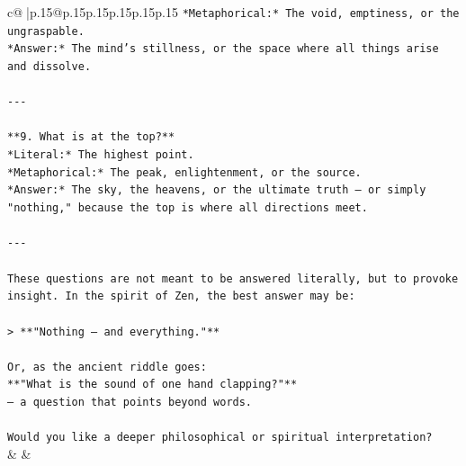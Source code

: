 \documentclass{article}
\begin{document}
{\begin{supertabular}{c@{$\;$}|p{.15\linewidth}@{}p{.15\linewidth}p{.15\linewidth}p{.15\linewidth}p{.15\linewidth}p{.15\linewidth}}
{{{\texttt{*Metaphorical:* The void, emptiness, or the ungraspable.  } \\
\texttt{*Answer:* The mind’s stillness, or the space where all things arise and dissolve.} \\
\\ 
\texttt{{-}{-}{-}} \\
\\ 
\texttt{**9. What is at the top?**  } \\
\texttt{*Literal:* The highest point.  } \\
\texttt{*Metaphorical:* The peak, enlightenment, or the source.  } \\
\texttt{*Answer:* The sky, the heavens, or the ultimate truth — or simply "nothing," because the top is where all directions meet.} \\
\\ 
\texttt{{-}{-}{-}} \\
\\ 
\texttt{These questions are not meant to be answered literally, but to provoke insight. In the spirit of Zen, the best answer may be:} \\
\\ 
\texttt{> **"Nothing — and everything."**} \\
\\ 
\texttt{Or, as the ancient riddle goes:  } \\
\texttt{**"What is the sound of one hand clapping?"**  } \\
\texttt{— a question that points beyond words.} \\
\\ 
\texttt{Would you like a deeper philosophical or spiritual interpretation?} \\
            }
        }
    }
    & & \\ \\


\end{supertabular}}
\end{document}
